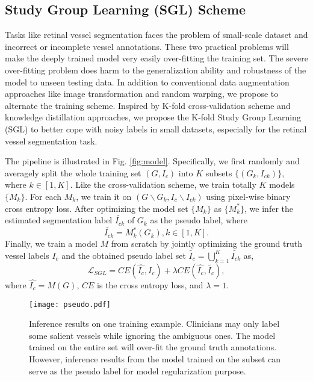 \documentclass[runningheads]{llncs}
\begin{document}
\subsection{Study Group Learning (SGL) Scheme}
Tasks like retinal vessel segmentation faces the problem of small-scale dataset and incorrect or incomplete vessel annotations. These two practical problems will make the deeply trained model very easily over-fitting the training set. The severe over-fitting problem does harm to the generalization ability and robustness of the model to unseen testing data. In addition to conventional data augmentation approaches like image transformation and random warping, we propose to alternate the training scheme. Inspired by K-fold cross-validation scheme and knowledge distillation \cite{hinton2015distilling} approaches, we propose the K-fold Study Group Learning (SGL) to better cope with noisy labels in small datasets, especially for the retinal vessel segmentation task.

The pipeline is illustrated in Fig. \ref{fig:model}. Specifically, we first randomly and averagely split the whole training set $(G, I_c)$ into $K$ subsets $\{(G_k, I_{ck})\}$, where $k \in [1, K]$. Like the cross-validation scheme, we train totally $K$ models $\{M_k\}$. For each $M_k$, we train it on $(G\backslash G_k, I_c\backslash I_{ck})$ using pixel-wise binary cross entropy loss. After optimizing the model set $\{M_k\}$ as $\{M_k^*\}$, we infer the estimated segmentation label $\tilde{I_{ck}}$ of $G_k$ as the pseudo label, where
 \begin{equation}
     \tilde{I_{ck}} = M_k^* (G_k), k\in [1,K].
 \end{equation}
Finally, we train a model $M$ from scratch by jointly optimizing the ground truth vessel labels $I_c$ and the obtained pseudo label set $\tilde{I_c} = \bigcup_{k=1}^{K}\tilde{I_{ck}}$ as,
 \begin{equation}
     \mathcal{L}_{SGL} = CE(\hat{I_c}, I_c) + \lambda CE(\hat{I_c}, \tilde{I_c}),
\label{eq:loss}
 \end{equation}
where $\hat{I_c} = M(G)$, $CE$ is the cross entropy loss, and $\lambda=1$.
\begin{figure}[t]\centering
\texttt{[image: pseudo.pdf]}
\caption{Inference results on one training example. Clinicians may only label some salient vessels while ignoring the ambiguous ones. The model trained on the entire set will over-fit the ground truth annotations. However, inference results from the model trained on the subset can serve as the pseudo label for model regularization purpose. }
  \label{fig:inf}
\end{figure}
\end{document}
